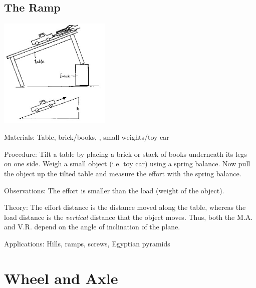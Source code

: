 \begin{multicols}{2}
\subsection{The Ramp}

\begin{center}
\includegraphics[width=0.4\textwidth]{./img/source/inclined-plane-2.jpg}
\end{center}

\begin{description*}
\item[Materials:]{Table, brick/books, , small weights/toy car}
\item[Procedure:]{Tilt a table by placing a brick or stack of books underneath its legs on one side. Weigh a small object (i.e. toy car) using a spring balance. Now pull the object up the tilted table and measure the effort with the spring balance.}
\item[Observations:]{The effort is smaller than the load (weight of the object).}
\item[Theory:]{The effort distance is the distance moved along the table, whereas the load distance is the \emph{vertical} distance that the object moves. Thus, both the M.A. and V.R. depend on the angle of inclination of the plane.}
\item[Applications:]{Hills, ramps, screws, Egyptian pyramids}
\end{description*}


\section*{Wheel and Axle}



\end{multicols}
